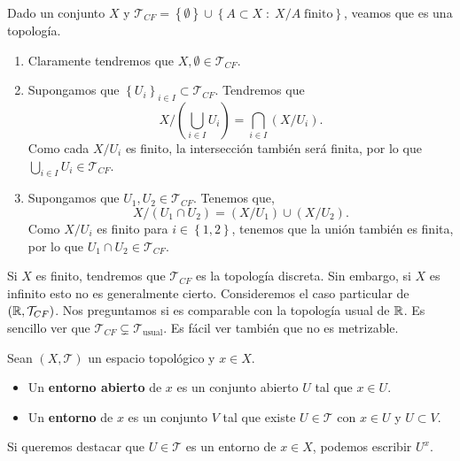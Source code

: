 \begin{eg}
	Dado un conjunto $\displaystyle X $ y $\displaystyle \mathcal{T}_{CF}= \left\{ \emptyset\right\} \cup \left\{ A \subset X \; : \; X/A \; \text{finito}\right\}  $, veamos que es una topología.
\begin{enumerate}
\item Claramente tendremos que $\displaystyle X, \emptyset \in \mathcal{T}_{CF} $. 
\item Supongamos que $\displaystyle \left\{ U_{i}\right\} _{i \in I}\subset \mathcal{T}_{CF} $. Tendremos que 
	\[X/ \left(\bigcup_{i \in I}U_{i}\right)= \bigcap_{i \in I}\left(X/U_{i}\right) .\]
Como cada $\displaystyle X/U_{i} $ es finito, la intersección también será finita, por lo que $\displaystyle \bigcup_{i \in I}U_{i} \in \mathcal{T}_{CF} $.
\item Supongamos que $\displaystyle U_{1}, U_{2} \in \mathcal{T}_{CF} $. Tenemos que,
	\[X / \left(U_{1} \cap U_{2}\right)= \left(X/U_{1}\right) \cup \left(X/U_{2}\right) .\]
	Como $\displaystyle X/U_{i} $ es finito para $\displaystyle i \in \left\{ 1,2\right\}  $, tenemos que la unión también es finita, por lo que $\displaystyle U_{1} \cap U_{2} \in \mathcal{T}_{CF} $. 
\end{enumerate}

Si $\displaystyle X $ es finito, tendremos que $\displaystyle \mathcal{T}_{CF} $ es la topología discreta. Sin embargo, si $\displaystyle X $ es infinito esto no es generalmente cierto. Consideremos el caso particular de $\displaystyle \left(\mathbb{R}, \mathcal{T}_{CF}\right) $. Nos preguntamos si es comparable con la topología usual de $\displaystyle \mathbb{R} $. Es sencillo ver que $\displaystyle \mathcal{T}_{CF}\subsetneq \mathcal{T}_{\text{usual}} $. Es fácil ver también que no es metrizable. 
\end{eg}
\begin{definition}[Entornos]
Sean $\displaystyle \left(X, \mathcal{T}\right) $ un espacio topológico y $\displaystyle x \in X $. 
\begin{itemize}
\item Un \textbf{entorno abierto} de $\displaystyle x $ es un conjunto abierto $\displaystyle U $ tal que $\displaystyle x \in U $.
\item Un \textbf{entorno} de $\displaystyle x $ es un conjunto $\displaystyle V $ tal que existe $\displaystyle U \in \mathcal{T} $ con $\displaystyle x \in U $ y $\displaystyle U \subset V $.
\end{itemize}
\end{definition}
\begin{notation}
Si queremos destacar que $\displaystyle U \in \mathcal{T} $ es un entorno de $\displaystyle x \in X $, podemos escribir $\displaystyle U^{x} $. 
\end{notation}

